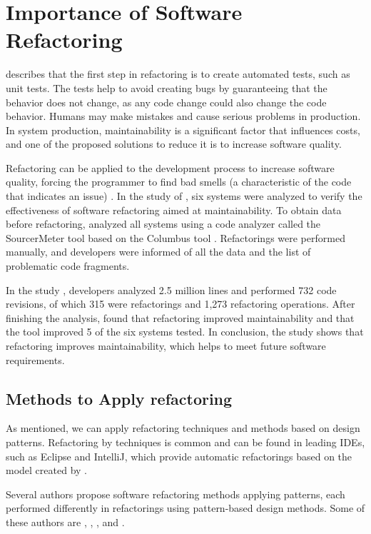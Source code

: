 \section{Importance of Software Refactoring}
\label{sec-importance}
\textcite{fowler2018refactoring} describes that the first step in refactoring is to create automated tests, such as unit tests. The tests help to avoid creating bugs by guaranteeing that the behavior does not change, as any code change could also change the code behavior. Humans may make mistakes and cause serious problems in production. In system production, maintainability is a significant factor that influences costs, and one of the proposed solutions to reduce it is to increase software quality. 

Refactoring can be applied to the development process to increase software quality, forcing the programmer to find bad smells (a characteristic of the code that indicates an issue) \cite{Wilking2007}. 
In the study of \textcite{szHoke2017empirical}, six systems were analyzed to verify the effectiveness of software refactoring aimed at maintainability. To obtain data before refactoring, \textcite{szHoke2017empirical} analyzed all systems using a code analyzer called the SourcerMeter tool based on the Columbus tool \cite{ferenc2002}. Refactorings were performed manually, and developers were informed of all the data and the list of problematic code fragments. 

In the study \textcite{szHoke2017empirical}, developers analyzed 2.5 million lines and performed 732 code revisions, of which 315 were refactorings and 1,273 refactoring operations. After finishing the analysis, \textcite{szHoke2017empirical} found that refactoring improved maintainability and that the tool improved 5 of the six systems tested. In conclusion, the study shows that refactoring improves maintainability, which helps to meet future software requirements.

\subsection{Methods to Apply refactoring}
\label{sub-methods}
As mentioned, we can apply refactoring techniques and methods based on design patterns. Refactoring by techniques is common and can be found in leading IDEs, such as Eclipse and IntelliJ, which provide automatic refactorings based on the model created by \textcite{fowler2018refactoring}. 

Several authors propose software refactoring methods applying patterns, each performed differently in refactorings using pattern-based design methods. Some of these authors are \textcite{Liu2014}, \textcite{zafeiris2017automated}, \textcite{cinneide2000automated}, and \cite{ouni2017more}. 

